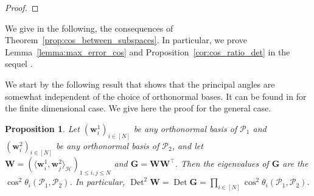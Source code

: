 \documentclass[twoside,11pt]{book}
\newtheorem{proposition}{Proposition}
\numberwithin{theorem}{chapter}
\numberwithin{definition}{chapter}
\numberwithin{proposition}{chapter}
\numberwithin{corollary}{chapter}
\numberwithin{example}{chapter}
\numberwithin{lemma}{chapter}
\numberwithin{assumption}{chapter}
\DeclareMathOperator{\Det}{Det}
\DeclareMathOperator{\Tran}{\intercal}
\begin{document}
\begin{proof}
\end{proof}
We give in the following, the consequences of Theorem~\ref{prop:cos_between_subspaces}. In particular, we prove Lemma~\ref{lemma:max_error_cos} and Proposition~\ref{cor:cos_ratio_det} in the sequel
.

We start by the following result that shows that the principal angles are somewhat independent of the choice of orthonormal bases. It can be found in \cite{BjGo73,MiBe92} for the finite dimensional case. We give here the proof for the general case.
\begin{proposition}\label{prop:cos_det_relationship}
Let $(\bm{w}^{1}_{i})_{i \in [N]}$ be any orthonormal basis of $\mathcal{P}_{1}$ and $(\bm{w}^{2}_{i})_{i \in [N]}$ be any orthonormal basis of $\mathcal{P}_{2}$, and let $\bm{W} = (\langle \bm{w}^{1}_{i},\bm{w}^{2}_{j} \rangle_{\mathcal{H}})_{1\leq i,j \leq N}$ and $\bm{G} = \bm{W}\bm{W}^{\Tran}$. Then
the eigenvalues of $\bm{G}$ are the $\cos^{2} \theta_{i}(\mathcal{P}_{1},\mathcal{P}_{2})$. In particular, $\Det^{2} \bm{W} = \Det \bm{G} =  \prod\limits_{i \in [N]} \cos^{2} \theta_{i}(\mathcal{P}_{1},\mathcal{P}_{2})$.
\end{proposition}
\end{document}
